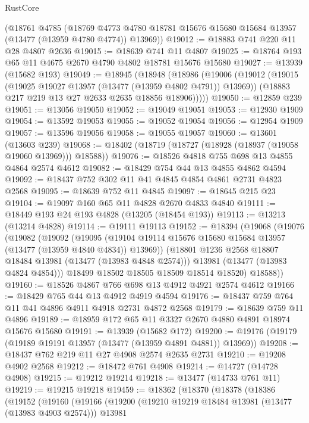 \begin{lexlean}{RustCore}
\begin{coremodule}
    (@18761
      @4785
      (@18769 @4773 @4780 @18781 @15676 @15680 @15684 @13957 (@13477 (@13959 @4780 @4774)) @13969))
@19012 := @18883 @741 @220 @11 @28 @4807 @2636
@19015 := @18639 @741 @11 @4807
@19025 := @18764 @193 @65 @11 @4675 @2670 @4790 @4802 @18781 @15676 @15680
@19027 := @13939 (@15682 @193)
@19049 := @18945
    (@18948
      (@18986
        (@19006
          (@19012
            (@19015 (@19025 @19027 @13957 (@13477 (@13959 @4802 @4791)) @13969))
            (@18883 @217 @219 @13 @27 @2633 @2635 @18856 @18906)))))
@19050 := @12859 @239
@19051 := @13056 @19050
@19052 := @19049 @19051
@19053 := @12930 @1909
@19054 := @13592 @19053
@19055 := @19052 @19054
@19056 := @12954 @1909
@19057 := @13596 @19056
@19058 := @19055 @19057
@19060 := @13601 (@13603 @239)
@19068 := @18402 (@18719 (@18727 (@18928 (@18937 (@19058 @19060 @13969))) @18588))
@19076 := @18526 @4818 @755 @698 @13 @4855 @4864 @2574 @4612
@19082 := @18429 @754 @44 @13 @4855 @4862 @4594
@19092 := @18437 @752 @302 @11 @41 @4845 @4854 @4861 @2731 @4823 @2568
@19095 := @18639 @752 @11 @4845
@19097 := @18645 @215 @23
@19104 := @19097 @160 @65 @11 @4828 @2670 @4833 @4840
@19111 := @18449 @193 @24 @193 @4828 (@13205 (@18454 @193))
@19113 := @13213 (@13214 @4828)
@19114 := @19111 @19113
@19152 := @18394
    (@19068
      (@19076
        (@19082
          (@19092
            (@19095
              (@19104 @19114 @15676 @15680 @15684 @13957 (@13477 (@13959 @4840 @4834)) @13969))
            (@18801 @1236 @2568 @18807 @18484 @13981 (@13477 (@13983 @4848 @2574)))
            @13981
            (@13477 (@13983 @4824 @4854)))
          @18499
          @18502
          @18505
          @18509
          @18514
          @18520)
        @18588))
@19160 := @18526 @4867 @766 @698 @13 @4912 @4921 @2574 @4612
@19166 := @18429 @765 @44 @13 @4912 @4919 @4594
@19176 := @18437 @759 @764 @11 @41 @4896 @4911 @4918 @2731 @4872 @2568
@19179 := @18639 @759 @11 @4896
@19189 := @18959 @172 @65 @11 @3327 @2670 @4880 @4891 @18974 @15676 @15680
@19191 := @13939 (@15682 @172)
@19200 := @19176 (@19179 (@19189 @19191 @13957 (@13477 (@13959 @4891 @4881)) @13969))
@19208 := @18437 @762 @219 @11 @27 @4908 @2574 @2635 @2731
@19210 := @19208 @4902 @2568
@19212 := @18472 @761 @4908
@19214 := @14727 (@14728 @4908)
@19215 := @19212 @19214
@19218 := @13477 (@14733 @761 @11)
@19219 := @19215 @19218
@19459 := @18362
    (@18370
      (@18378
        (@18386
          (@19152
            (@19160
              (@19166
                (@19200
                  (@19210 @19219 @18484 @13981 (@13477 (@13983 @4903 @2574)))
                  @13981

\end{coremodule}
\end{lexlean}
